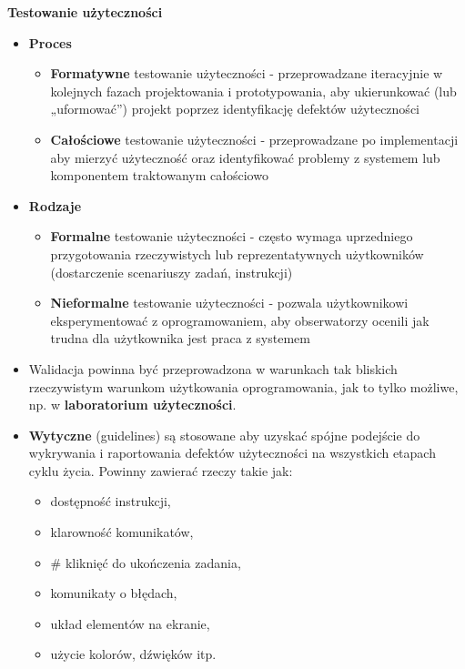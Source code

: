 \documentclass[../main.tex]{subfiles}
\begin{document}
    \textbf{Testowanie użyteczności}
    \begin{itemize}
        \item \textbf{Proces}
        \begin{itemize}
            \item \textbf{Formatywne} testowanie użyteczności - przeprowadzane iteracyjnie w
            kolejnych fazach projektowania i prototypowania, aby ukierunkować
            (lub „uformować”) projekt poprzez identyfikację defektów użyteczności
            \item \textbf{Całościowe} testowanie użyteczności - przeprowadzane po implementacji
            aby mierzyć użyteczność oraz identyfikować problemy z systemem
            lub komponentem traktowanym całościowo
        \end{itemize}

        \item \textbf{Rodzaje}
        \begin{itemize}
            \item \textbf{Formalne} testowanie użyteczności - często wymaga uprzedniego przygotowania rzeczywistych
            lub reprezentatywnych użytkowników (dostarczenie scenariuszy zadań, instrukcji)
            \item \textbf{Nieformalne} testowanie użyteczności - pozwala użytkownikowi eksperymentować z
            oprogramowaniem, aby obserwatorzy ocenili jak trudna dla użytkownika jest praca z systemem
        \end{itemize}

        \item Walidacja powinna być przeprowadzona w warunkach tak bliskich rzeczywistym warunkom użytkowania
        oprogramowania, jak to tylko możliwe, np. w \textbf{laboratorium użyteczności}.\\

        \item \textbf{Wytyczne} (guidelines) są stosowane aby uzyskać spójne podejście do wykrywania i raportowania defektów
        użyteczności na wszystkich etapach cyklu życia. Powinny zawierać rzeczy takie jak:
        \begin{itemize}
            \item dostępność instrukcji,
            \item klarowność komunikatów,
            \item \# kliknięć do ukończenia zadania,
            \item komunikaty o błędach,
            \item układ elementów na ekranie,
            \item użycie kolorów, dźwięków itp.
        \end{itemize}


\end{itemize}
\end{document}
